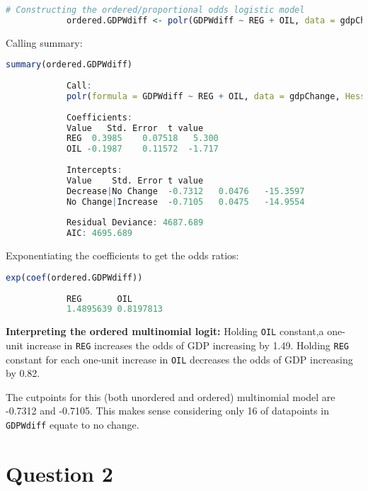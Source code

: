 \documentclass[12pt,letterpaper]{article}
\begin{document}
\begin{enumerate}
\begin{lstlisting}[language=R]
			# Constructing the ordered/proportional odds logistic model
			ordered.GDPWdiff <- polr(GDPWdiff ~ REG + OIL, data = gdpChange, Hess = TRUE)
		\end{lstlisting}
		
		\vspace{.35cm}
		
		Calling summary:
		\begin{lstlisting}[language=R]
			summary(ordered.GDPWdiff)
			
			Call:
			polr(formula = GDPWdiff ~ REG + OIL, data = gdpChange, Hess = TRUE)
			
			Coefficients:
			Value 	Std. Error 	t value
			REG  0.3985    0.07518   5.300
			OIL -0.1987    0.11572  -1.717
			
			Intercepts:
			Value    Std. Error t value 
			Decrease|No Change  -0.7312   0.0476   -15.3597
			No Change|Increase  -0.7105   0.0475   -14.9554
			
			Residual Deviance: 4687.689 
			AIC: 4695.689 
		\end{lstlisting}
		
		\vspace{.35cm}
		
		Exponentiating the coefficients to get the odds ratios: 
		\begin{lstlisting}[language=R]
			exp(coef(ordered.GDPWdiff))
			
			REG       OIL 
			1.4895639 0.8197813 
		\end{lstlisting}
		
		\vspace{.35cm}
		
		\textbf{Interpreting the ordered multinomial logit:} Holding \texttt{OIL} constant,a one-unit increase in \texttt{REG} increases the odds of GDP increasing by 1.49. Holding \texttt{REG} constant for each one-unit increase in \texttt{OIL} decreases the odds of GDP increasing by 0.82.
		
		\vspace{.2cm}
		
		The cutpoints for this (both unordered and ordered) multinomial model are -0.7312 and -0.7105. This makes sense considering only 16 of datapoints in \texttt{GDPWdiff} equate to no change.
		
		\vspace{.5cm}
	\end{enumerate}
	
	\section*{Question 2} 
	\vspace{.25cm}
	
\end{document}
